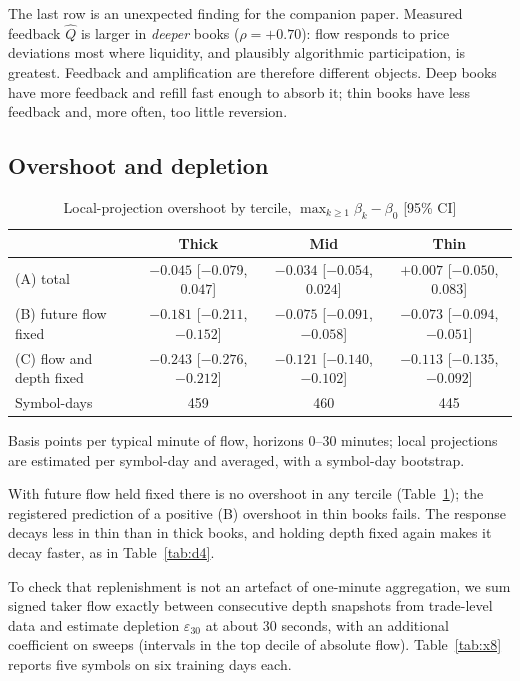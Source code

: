 \documentclass[12pt]{article}
\theoremstyle{definition}
\theoremstyle{remark}
\begin{document}
The last row is an unexpected finding for the companion paper. Measured feedback $\hat Q$ is larger in \emph{deeper} books ($\rho=+0.70$): flow responds to price deviations most where liquidity, and plausibly algorithmic participation, is greatest. Feedback and amplification are therefore different objects. Deep books have more feedback and refill fast enough to absorb it; thin books have less feedback and, more often, too little reversion.

\subsection{Overshoot and depletion}

\begin{table}[t]\centering\small
\begin{threeparttable}
\caption{Local-projection overshoot by tercile, $\max_{k\ge1}\beta_k-\beta_0$ [95\% CI]}\label{tab:x4}
\setlength{\tabcolsep}{3pt}
\begin{tabular}{lccc}
\toprule
 & Thick & Mid & Thin\\
\midrule
(A) total & $-0.045$ [$-0.079$, $0.047$] & $-0.034$ [$-0.054$, $0.024$] & $+0.007$ [$-0.050$, $0.083$]\\
(B) future flow fixed & $-0.181$ [$-0.211$, $-0.152$] & $-0.075$ [$-0.091$, $-0.058$] & $-0.073$ [$-0.094$, $-0.051$]\\
(C) flow and depth fixed & $-0.243$ [$-0.276$, $-0.212$] & $-0.121$ [$-0.140$, $-0.102$] & $-0.113$ [$-0.135$, $-0.092$]\\
Symbol-days & 459 & 460 & 445\\
\bottomrule
\end{tabular}
\begin{tablenotes}\footnotesize\item Basis points per typical minute of flow, horizons 0--30 minutes; local projections are estimated per symbol-day and averaged, with a symbol-day bootstrap. \end{tablenotes}
\end{threeparttable}
\end{table}

With future flow held fixed there is no overshoot in any tercile (Table~\ref{tab:x4}); the registered prediction of a positive (B) overshoot in thin books fails. The response decays less in thin than in thick books, and holding depth fixed again makes it decay faster, as in Table~\ref{tab:d4}.

To check that replenishment is not an artefact of one-minute aggregation, we sum signed taker flow exactly between consecutive depth snapshots from trade-level data and estimate depletion $\varepsilon_{30}$ at about 30 seconds, with an additional coefficient on sweeps (intervals in the top decile of absolute flow). Table~\ref{tab:x8} reports five symbols on six training days each.
\end{document}
